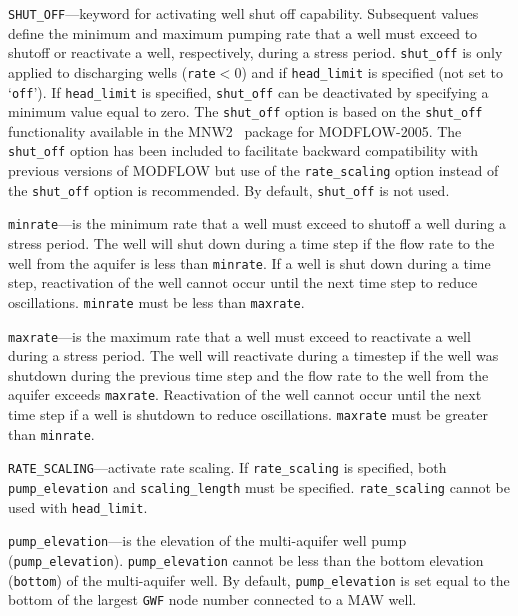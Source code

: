 \begin{description}
\item \texttt{SHUT\_OFF}---keyword for activating well shut off capability.  Subsequent values define the minimum and maximum pumping rate that a well must exceed to shutoff or reactivate a well, respectively, during a stress period. \texttt{shut\_off} is only applied to discharging wells (\texttt{rate}$<0$) and if \texttt{head\_limit} is specified (not set to `\texttt{off}').  If \texttt{head\_limit} is specified, \texttt{shut\_off} can be deactivated by specifying a minimum value equal to zero. The \texttt{shut\_off} option is based on the \texttt{shut\_off} functionality available in the MNW2~\citep{konikow2009} package for MODFLOW-2005. The \texttt{shut\_off} option has been included to facilitate backward compatibility with previous versions of MODFLOW but use of the \texttt{rate\_scaling} option instead of the \texttt{shut\_off} option is recommended. By default, \texttt{shut\_off} is not used.

\item \texttt{minrate}---is the minimum rate that a well must exceed to shutoff a well during a stress period. The well will shut down during a time step if the flow rate to the well from the aquifer is less than \texttt{minrate}. If a well is shut down during a time step, reactivation of the well cannot occur until the next time step to reduce oscillations. \texttt{minrate} must be less than \texttt{maxrate}.

\item \texttt{maxrate}---is the maximum rate that a well must exceed to reactivate a well during a stress period. The well will reactivate during a timestep if the well was shutdown during the previous time step and the flow rate to the well from the aquifer exceeds \texttt{maxrate}. Reactivation of the well cannot occur until the next time step if a well is shutdown to reduce oscillations. \texttt{maxrate} must be greater than \texttt{minrate}.

\item \texttt{RATE\_SCALING}---activate rate scaling.  If \texttt{rate\_scaling} is specified, both \texttt{pump\_elevation} and \texttt{scaling\_length} must be specified. \texttt{rate\_scaling} cannot be used with \texttt{head\_limit}.

\item \texttt{pump\_elevation}---is the elevation of the multi-aquifer well pump (\texttt{pump\_elevation}).  \texttt{pump\_elevation} cannot be less than the bottom elevation (\texttt{bottom}) of the multi-aquifer well. By default, \texttt{pump\_elevation} is set equal to the bottom of the largest \texttt{GWF} node number connected to a MAW well.


\end{description}
